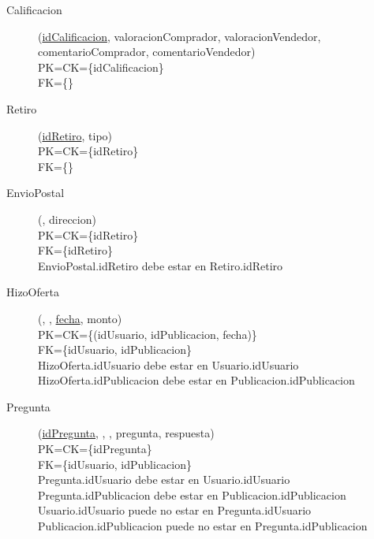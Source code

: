 \begin{description}

 \item[Calificacion](\underline{idCalificacion}, valoracionComprador, valoracionVendedor, comentarioComprador, comentarioVendedor)\\
PK=CK=\{idCalificacion\}\\
FK=\{\}

 \item[Retiro](\underline{idRetiro}, tipo)\\
PK=CK=\{idRetiro\}\\
FK=\{\}

 \item[EnvioPostal](\underline{}, direccion)\\
PK=CK=\{idRetiro\}\\
FK=\{idRetiro\}\\
EnvioPostal.idRetiro debe estar en Retiro.idRetiro

  \item[HizoOferta](\underline{}, \underline{}, \underline{fecha}, monto)\\
PK=CK=\{(idUsuario, idPublicacion, fecha)\}\\
FK=\{idUsuario, idPublicacion\}\\
HizoOferta.idUsuario debe estar en Usuario.idUsuario\\
HizoOferta.idPublicacion debe estar en Publicacion.idPublicacion

  \item[Pregunta](\underline{idPregunta}, , , pregunta, respuesta)\\
PK=CK=\{idPregunta\}\\
FK=\{idUsuario, idPublicacion\}\\
Pregunta.idUsuario debe estar en Usuario.idUsuario\\
Pregunta.idPublicacion debe estar en Publicacion.idPublicacion\\
Usuario.idUsuario puede no estar en Pregunta.idUsuario\\
Publicacion.idPublicacion puede no estar en Pregunta.idPublicacion


\end{description}
